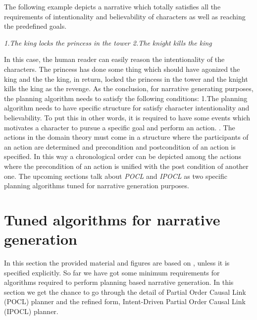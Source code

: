 \documentclass[english]{tktltiki}
\begin{document}
The following example depicts a narrative which totally satisfies all the requirements of intentionality and believability of characters as well as reaching the predefined goals.
\begin{flushleft}
\textit{1.The king locks the princess in the tower \newline 2.The knight kills the king}
\end{flushleft} 
In this case, the human reader can easily reason the intentionality of the characters. The princess has done some thing which should have agonized the king and the the king, in return, locked the princess in the tower and the knight kills the king as the revenge. \newline
As the conclusion, for narrative generating purposes, the planning algorithm needs to satisfy the following conditions: \newline
1.The planning algorithm needs to have specific structure for satisfy character intentionality and believability. To put this in other words, it is required to have some events which motivates a character to pursue a specific goal and perform an action. . The actions in the domain theory must come in a structure where the participants of an action are determined and precondition and postcondition of an action is specified. In this way a chronological order can be depicted among the actions where the precondition of an action is unified with the post condition of another one.\newline
The upcoming sections talk about \textit{POCL} and \textit{IPOCL} as two specific planning algorithms tuned for narrative generation purposes.
\section{Tuned algorithms for narrative generation}
In this section the provided material and figures are based on \cite{planning:2010:NPB:1946417.1946422}, unless it is specified explicitly.
So far we have got some minimum requirements for algorithms required to perform planning based narrative generation. In this section we get the chance to go through the detail of Partial Order Causal Link (POCL) planner and the refined form, Intent-Driven Partial Order Causal Link (IPOCL) planner.
\end{document}
